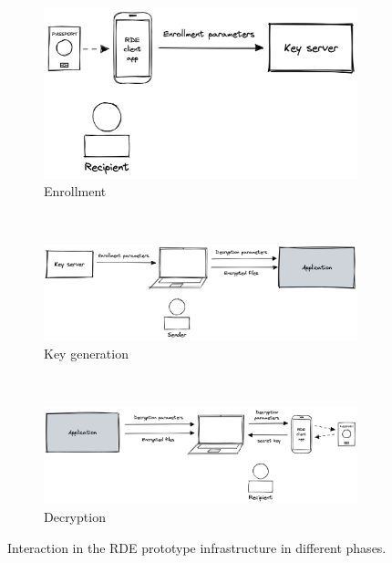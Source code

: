 \begin{figure}
    \centering
    \begin{subfigure}[b]{0.5\textwidth}
        \centering
        \includegraphics[width=\textwidth]{imgs/RDE enrollment detail}
        \caption{Enrollment}
        \label{fig:rde-enrollment-detail}
    \end{subfigure}\\
    \vspace{1cm}
    \begin{subfigure}[b]{0.8\textwidth}
        \centering
        \includegraphics[width=\textwidth]{imgs/RDE keygen detail}
        \caption{Key generation}
        \label{fig:rde-keygen-detail}
    \end{subfigure}\\
    \vspace{1cm}
    \begin{subfigure}[b]{0.8\textwidth}
        \centering
        \includegraphics[width=\textwidth]{imgs/RDE decryption detail}
        \caption{Decryption}
        \label{fig:rde-decryption-detail}
    \end{subfigure}
    \caption{Interaction in the RDE prototype infrastructure in different phases.}
    \label{fig:rde-detail}
\end{figure}

